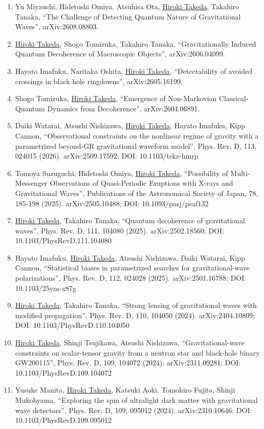 \documentclass[uplatex, 11pt]{jsarticle}
\begin{document}
\begin{enumerate}
\item Yu Miyauchi, Hidetoshi Omiya, Atsuhisa Ota, \uline{Hiroki Takeda}, Takahiro Tanaka, “The Challenge of Detecting Quantum Nature of Gravitational Waves”, arXiv:2608.08803.
\item \uline{Hiroki Takeda}, Shogo Tomizuka, Takahiro Tanaka, “Gravitationally Induced Quantum Decoherence of Macroscopic Objects”, arXiv:2606.04099.
\item Hayato Imafuku, Naritaka Oshita, \uline{Hiroki Takeda}, “Detectability of avoided crossings in black hole ringdowns”, arXiv:2605.16199.
\item Shogo Tomizuka, \uline{Hiroki Takeda}, “Emergence of Non-Markovian Classical-Quantum Dynamics from Decoherence”, arXiv:2604.06891.
\item Daiki Watarai, Atsushi Nishizawa, \uline{Hiroki Takeda}, Hayato Imafuku, Kipp Cannon, “Observational constraints on the nonlinear regime of gravity with a parametrized beyond-GR gravitational waveform model”, Phys. Rev. D, 113, 024015 (2026). arXiv:2509.17592; DOI: 10.1103/tskz-hmrp
\item Tomoya Suzuguchi, Hidetoshi Omiya, \uline{Hiroki Takeda}, “Possibility of Multi-Messenger Observations of Quasi-Periodic Eruptions with X-rays and Gravitational Waves”, Publications of the Astronomical Society of Japan, 78, 185-198 (2025). arXiv:2505.10488; DOI: 10.1093/pasj/psaf132
\item \uline{Hiroki Takeda}, Takahiro Tanaka, “Quantum decoherence of gravitational waves”, Phys. Rev. D, 111, 104080 (2025). arXiv:2502.18560; DOI: 10.1103/PhysRevD.111.104080
\item Hayato Imafuku, \uline{Hiroki Takeda}, Atsushi Nishizawa, Daiki Watarai, Kipp Cannon, “Statistical biases in parametrized searches for gravitational-wave polarizations”, Phys. Rev. D, 112, 024028 (2025). arXiv:2501.16788; DOI: 10.1103/25ym-x87g
\item \uline{Hiroki Takeda}, Takahiro Tanaka, “Strong lensing of gravitational waves with modified propagation”, Phys. Rev. D, 110, 104050 (2024). arXiv:2404.10809; DOI: 10.1103/PhysRevD.110.104050
\item \uline{Hiroki Takeda}, Shinji Tsujikawa, Atsushi Nishizawa, “Gravitational-wave constraints on scalar-tensor gravity from a neutron star and black-hole binary GW200115”, Phys. Rev. D, 109, 104072 (2024). arXiv:2311.09281; DOI: 10.1103/PhysRevD.109.104072
\item Yusuke Manita, \uline{Hiroki Takeda}, Katsuki Aoki, Tomohiro Fujita, Shinji Mukohyama, “Exploring the spin of ultralight dark matter with gravitational wave detectors”, Phys. Rev. D, 109, 095012 (2024). arXiv:2310.10646; DOI: 10.1103/PhysRevD.109.095012

\end{enumerate}
\end{document}
